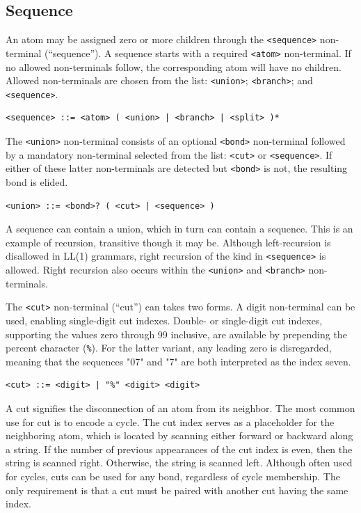 \documentclass{article}
\def\ttt{\texttt}
\begin{document}
\subsection*{Sequence}

An atom may be assigned zero or more children through the \ttt{<sequence>} non-terminal (\enquote{sequence}). A sequence starts with a required \ttt{<atom>} non-terminal. If no allowed non-terminals follow, the corresponding atom will have no children. Allowed non-terminals are chosen from the list: \ttt{<union>}; \ttt{<branch>}; and \ttt{<sequence>}.

\begin{lstlisting}
<sequence> ::= <atom> ( <union> | <branch> | <split> )*
\end{lstlisting}

The \ttt{<union>} non-terminal consists of an optional \ttt{<bond>} non-terminal followed by a mandatory non-terminal selected from the list: \ttt{<cut>} or \ttt{<sequence>}. If either of these latter non-terminals are detected but \ttt{<bond>} is not, the resulting bond is elided.

\begin{lstlisting}
<union> ::= <bond>? ( <cut> | <sequence> )
\end{lstlisting}

A sequence can contain a union, which in turn can contain a sequence. This is an example of recursion, transitive though it may be. Although left-recursion is disallowed in LL(1) grammars, right recursion of the kind in \ttt{<sequence>} is allowed. Right recursion also occurs within the \ttt{<union>} and \ttt{<branch>} non-terminals.

The \ttt{<cut>} non-terminal (\enquote{cut}) can takes two forms. A digit non-terminal can be used, enabling single-digit cut indexes. Double- or single-digit cut indexes, supporting the values zero through 99 inclusive, are available by prepending the percent character (\ttt{\%}). For the latter variant, any leading zero is disregarded, meaning that the sequences "07" and "7" are both interpreted as the index seven.

\begin{lstlisting}
<cut> ::= <digit> | "%" <digit> <digit>
\end{lstlisting}

A cut signifies the disconnection of an atom from its neighbor. The most common use for cut is to encode a cycle. The cut index serves as a placeholder for the neighboring atom, which is located by scanning either forward or backward along a string. If the number of previous appearances of the cut index is even, then the string is scanned right. Otherwise, the string is scanned left. Although often used for cycles, cuts can be used for any bond, regardless of cycle membership. The only requirement is that a cut must be paired with another cut having the same index.
\end{document}
